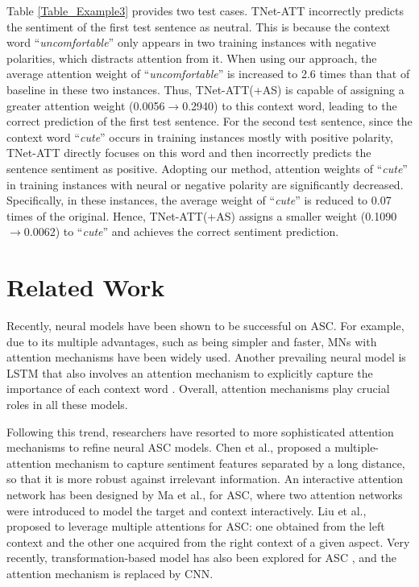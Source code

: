 \documentclass[11pt,a4paper]{article}
\begin{document}
Table \ref{Table_Example3} provides two test cases.
TNet-ATT incorrectly predicts the sentiment of the first test sentence as neutral.
This is because the context word ``\emph{uncomfortable}'' only appears in two training instances with negative polarities,
which distracts attention from it.
When using our approach,
the average attention weight of ``\emph{uncomfortable}'' is increased to 2.6 times than that of baseline in these two instances.
Thus,
TNet-ATT(+AS) is capable of assigning a greater attention weight (0.0056$\rightarrow$0.2940) to this context word,
leading to the correct prediction of the first test sentence.
For the second test sentence,
since the context word ``\emph{cute}'' occurs in training instances mostly with positive polarity,
TNet-ATT directly focuses on this word and then incorrectly predicts the sentence sentiment as positive.
Adopting our method,
attention weights of ``\emph{cute}'' in training instances with neural or negative polarity are significantly decreased.
Specifically, in these instances,
the average weight of ``\emph{cute}'' is reduced to 0.07 times of the original.
Hence,
TNet-ATT(+AS) assigns a smaller weight (0.1090$\rightarrow$0.0062) to ``\emph{cute}'' and achieves the correct sentiment prediction.


\section{Related Work}
Recently,
neural models have been shown to be successful on ASC.
For example,
due to its multiple advantages,
such as being simpler and faster,
MNs with attention mechanisms \cite{Tang:EMNLP2016,Wang:ACL2018} have been widely used.
Another prevailing neural model is LSTM that also involves an attention mechanism to explicitly capture the importance of each context word \cite{Wang:EMNLP2016}.
Overall,
attention mechanisms play crucial roles in all these models.

Following this trend,
researchers have resorted to more sophisticated attention mechanisms to refine neural ASC models.
Chen et al.,  proposed a multiple-attention mechanism to capture sentiment features separated by a long distance,
so that it is more robust against irrelevant information.
An interactive attention network has been designed by Ma et al.,  for ASC,
where two attention networks were introduced to model the target and context interactively.
Liu et al.,  proposed to leverage multiple attentions for ASC:
one obtained from the left context and
the other one acquired from the right context of a given aspect.
Very recently,
transformation-based model has also been explored for ASC \cite{Li:ACL2018},
and the attention mechanism is replaced by CNN.
\end{document}
